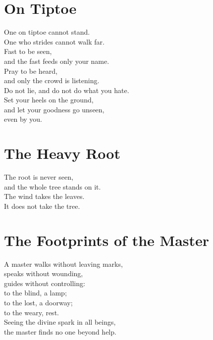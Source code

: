 \documentclass[10pt, openright]{book}
\newcommand{\sectionbreak}{\filbreak}
\newcommand{\sayingsource}[1]{\par\nopagebreak\vspace{0.3\baselineskip}{\raggedleft\footnotesize\itshape #1\par}}
\begin{document}
\sayingsource{Tao Te Ching 23 · John 3:8}

\sectionbreak

\section{On Tiptoe}\label{on-tiptoe}

One on tiptoe cannot stand.\\
One who strides cannot walk far.\\
Fast to be seen,\\
and the fast feeds only your name.\\
Pray to be heard,\\
and only the crowd is listening.\\
Do not lie, and do not do what you hate.\\
Set your heels on the ground,\\
and let your goodness go unseen,\\
even by you.

\sayingsource{Tao Te Ching 24 · Thomas 6, 14}

\sectionbreak

\section{The Heavy Root}\label{the-heavy-root}

The root is never seen,\\
and the whole tree stands on it.\\
The wind takes the leaves.\\
It does not take the tree.

\sayingsource{Tao Te Ching 26}

\sectionbreak

\section{The Footprints of the
Master}\label{the-footprints-of-the-master}

A master walks without leaving marks,\\
speaks without wounding,\\
guides without controlling:\\
to the blind, a lamp;\\
to the lost, a doorway;\\
to the weary, rest.\\
Seeing the divine spark in all beings,\\
the master finds no one beyond help.
\end{document}
